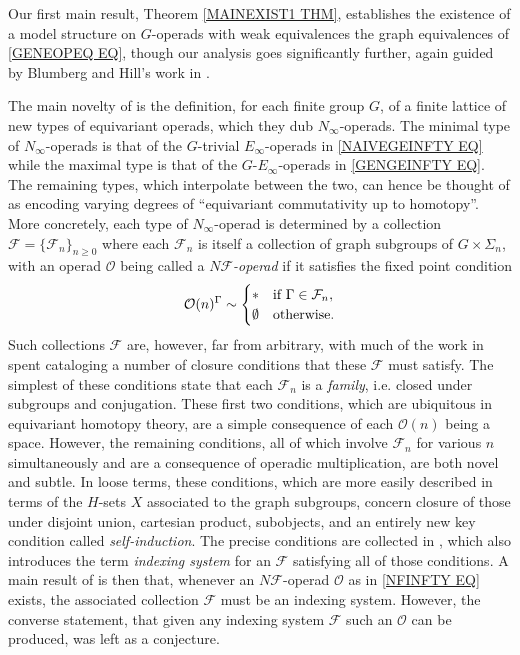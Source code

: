 \documentclass[a4paper,10pt
,draft
]{article}%
\numberwithin{equation}{section}
\numberwithin{figure}{section}
\theoremstyle{definition} %
\newcommand{\set}[1]{\left\{#1\right\}}%
\renewcommand{\O}{\ensuremath{\mathcal O}}
\newcommand{\1}{\ensuremath{\mathbbm 1}}%
\begin{document}
Our first main result, Theorem \ref{MAINEXIST1 THM}, 
establishes the existence of a model structure on $G$-operads with weak equivalences the graph equivalences of \eqref{GENEOPEQ EQ},
though our analysis goes significantly further, again guided by Blumberg and Hill's work in \cite{BH15}.

The main novelty of \cite{BH15} is the definition, for each finite group $G$, of a finite lattice of new types of equivariant operads, which they dub $N_{\infty}$-operads.
The minimal type of $N_{\infty}$-operads is that of the 
$G$-trivial $E_{\infty}$-operads in \eqref{NAIVEGEINFTY EQ} 
while the maximal type is that of the $G$-$E_{\infty}$-operads in \eqref{GENGEINFTY EQ}.
The remaining types, which interpolate between 
the two,
can hence be thought of as encoding varying degrees of ``equivariant commutativity up to homotopy''.
More concretely, each type of $N_{\infty}$-operad is determined by a collection
$\mathcal{F} = \{\mathcal{F}_n\}_{n \geq 0}$
\index{F@$\mathcal F = \set{\mathcal F_n}_{n \geq 0}$}
where each $\mathcal{F}_n$ is itself a collection of graph subgroups of $G \times \Sigma_n$,
with an operad $\O$ being called a
\textit{$N \mathcal{F}$-operad}
if it satisfies the fixed point condition
\begin{equation}\label{NFINFTY EQ}
	\O(n)^{\Gamma} \sim 
\begin{cases}
	\** & \text{if } \Gamma \in \mathcal{F}_n,
\\
	\emptyset & \text{otherwise}.
\end{cases}
\end{equation}
Such collections $\mathcal{F}$ are, however, far from arbitrary, with much of the work in \cite[\S 3]{BH15} spent cataloging a number of closure conditions that these $\mathcal{F}$ must satisfy.
The simplest of these conditions
state that each $\mathcal{F}_n$ is a \textit{family}, i.e. closed under subgroups and conjugation. These first two conditions, 
which are ubiquitous in equivariant homotopy theory,
are a simple consequence of each $\O(n)$ being a space.
However, the remaining conditions, 
all of which involve $\mathcal{F}_n$ for various $n$ simultaneously and are a consequence of operadic multiplication,
are both novel and subtle.
In loose terms, these conditions, 
which are more easily described in terms of the 
$H$-sets $X$ associated to the graph subgroups,
concern closure of those under 
disjoint union, cartesian product, subobjects,
and an entirely new key condition called \textit{self-induction}.
The precise conditions are collected in
\cite[Def. 3.22]{BH15},
which also introduces the term \textit{indexing system} for 
an $\mathcal{F}$ satisfying all of those conditions.
A main result of \cite[\S 4]{BH15} is then that,
whenever an $N\mathcal F$-operad $\O$ as in \eqref{NFINFTY EQ} exists,
the associated collection $\mathcal{F}$ must be an indexing system.
However, the converse statement, that given any indexing system $\mathcal{F}$ such an $\O$ can be produced, was left as a conjecture.
\end{document}
